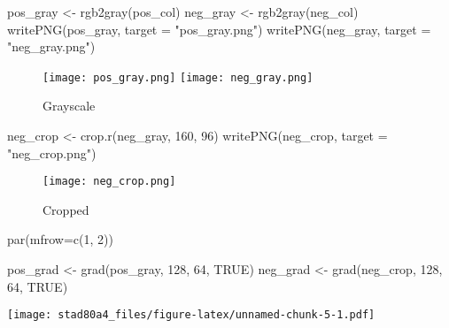 \documentclass[
]{article}
\newenvironment{Shaded}{\begin{snugshade}}{\end{snugshade}}
\newcommand{\AttributeTok}[1]{\textcolor[rgb]{0.77,0.63,0.00}{#1}}
\newcommand{\ConstantTok}[1]{\textcolor[rgb]{0.00,0.00,0.00}{#1}}
\newcommand{\DecValTok}[1]{\textcolor[rgb]{0.00,0.00,0.81}{#1}}
\newcommand{\FunctionTok}[1]{\textcolor[rgb]{0.00,0.00,0.00}{#1}}
\newcommand{\NormalTok}[1]{#1}
\newcommand{\OtherTok}[1]{\textcolor[rgb]{0.56,0.35,0.01}{#1}}
\newcommand{\StringTok}[1]{\textcolor[rgb]{0.31,0.60,0.02}{#1}}
\begin{document}
\begin{Shaded}
\begin{Highlighting}[]
\NormalTok{pos\_gray }\OtherTok{\textless{}{-}} \FunctionTok{rgb2gray}\NormalTok{(pos\_col)}
\NormalTok{neg\_gray }\OtherTok{\textless{}{-}} \FunctionTok{rgb2gray}\NormalTok{(neg\_col)}
\FunctionTok{writePNG}\NormalTok{(pos\_gray, }\AttributeTok{target =} \StringTok{"pos\_gray.png"}\NormalTok{)}
\FunctionTok{writePNG}\NormalTok{(neg\_gray, }\AttributeTok{target =} \StringTok{"neg\_gray.png"}\NormalTok{)}
\end{Highlighting}
\end{Shaded}

\begin{figure}
  \texttt{[image: pos\_gray.png]}
  \texttt{[image: neg\_gray.png]}
  \caption{Grayscale}
\end{figure}

\begin{Shaded}
\begin{Highlighting}[]
\NormalTok{neg\_crop }\OtherTok{\textless{}{-}} \FunctionTok{crop.r}\NormalTok{(neg\_gray, }\DecValTok{160}\NormalTok{, }\DecValTok{96}\NormalTok{)}
\FunctionTok{writePNG}\NormalTok{(neg\_crop, }\AttributeTok{target =} \StringTok{"neg\_crop.png"}\NormalTok{)}
\end{Highlighting}
\end{Shaded}

\begin{figure}
  \texttt{[image: neg\_crop.png]}
  \caption{Cropped}
\end{figure}

\begin{Shaded}
\begin{Highlighting}[]
\FunctionTok{par}\NormalTok{(}\AttributeTok{mfrow=}\FunctionTok{c}\NormalTok{(}\DecValTok{1}\NormalTok{, }\DecValTok{2}\NormalTok{))}

\NormalTok{pos\_grad }\OtherTok{\textless{}{-}} \FunctionTok{grad}\NormalTok{(pos\_gray, }\DecValTok{128}\NormalTok{, }\DecValTok{64}\NormalTok{, }\ConstantTok{TRUE}\NormalTok{) }
\NormalTok{neg\_grad }\OtherTok{\textless{}{-}} \FunctionTok{grad}\NormalTok{(neg\_crop, }\DecValTok{128}\NormalTok{, }\DecValTok{64}\NormalTok{, }\ConstantTok{TRUE}\NormalTok{)}
\end{Highlighting}
\end{Shaded}

\texttt{[image: stad80a4\_files/figure-latex/unnamed-chunk-5-1.pdf]}
\end{document}
